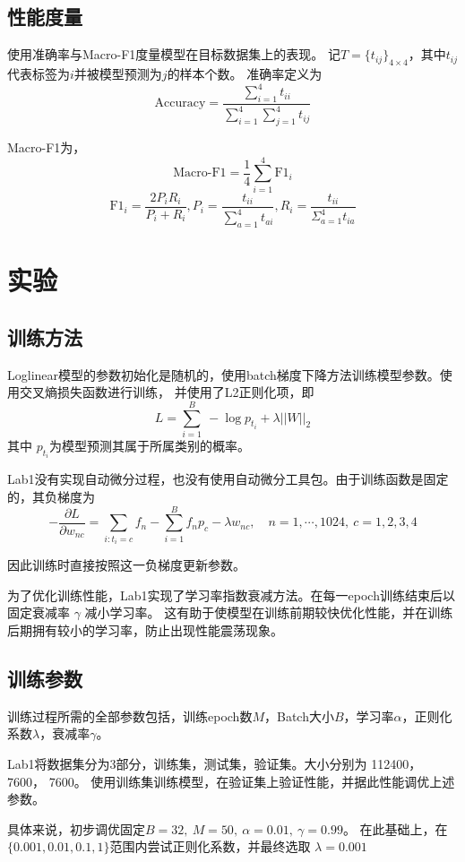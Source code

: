 \documentclass[12pt,letterpaper]{article}
\begin{document}
\subsection{性能度量}
使用准确率与Macro-F1度量模型在目标数据集上的表现。
记$T=\{t_{ij}\}_{4 \times 4}$，其中$t_{ij}$代表标签为$i$并被模型预测为$j$的样本个数。
准确率定义为 
$$\text{Accuracy} = \frac{\sum_{i=1}^4 t_{ii}}{\sum_{i=1}^4\sum_{j=1}^4 t_{ij}}$$

Macro-F1为，
$$\text{Macro-F1} = \frac{1}{4}\sum_{i=1}^4 \text{F1}_i$$
$$\text{F1}_i = \frac{2 P_i R_i}{P_i + R_i}, P_i = \frac{t_{ii}}{\sum_{a=1}^4 t_{ai}}, R_i = \frac{t_{ii}}{\Sigma_{a=1}^4 t_{ia}}$$


\section{实验}
\subsection{训练方法}
Loglinear模型的参数初始化是随机的，使用batch梯度下降方法训练模型参数。使用交叉熵损失函数进行训练，
并使用了L2正则化项，即
$$L = \sum_{i=1}^B \ - \log p_{t_i} + \lambda || W ||_2$$ 
其中 $p_{t_i}$为模型预测其属于所属类别的概率。

Lab1没有实现自动微分过程，也没有使用自动微分工具包。由于训练函数是固定的，其负梯度为
$$ - \frac{\partial L}{\partial w_{nc}} = \sum_{i: t_i = c} f_n - \sum_{i=1}^B f_n p_c  - \lambda w_{nc}, \quad n=1,\cdots,1024, \ c=1,2,3,4$$

因此训练时直接按照这一负梯度更新参数。

为了优化训练性能，Lab1实现了学习率指数衰减方法。在每一epoch训练结束后以固定衰减率 $\gamma$ 减小学习率。
这有助于使模型在训练前期较快优化性能，并在训练后期拥有较小的学习率，防止出现性能震荡现象。

\subsection{训练参数}
训练过程所需的全部参数包括，训练epoch数$M$，Batch大小$B$，学习率$\alpha$，正则化系数$\lambda$，衰减率$\gamma$。

Lab1将数据集分为3部分，训练集，测试集，验证集。大小分别为 112400， 7600， 7600。
使用训练集训练模型，在验证集上验证性能，并据此性能调优上述参数。

具体来说，初步调优固定$B=32,\ M=50,\ \alpha=0.01,\ \gamma=0.99$。
在此基础上，在$\{0.001, 0.01, 0.1, 1\}$范围内尝试正则化系数，并最终选取 $\lambda=0.001$
\end{document}

